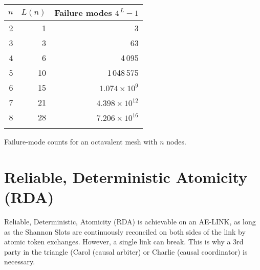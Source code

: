 \documentclass[../HFT-main.tex]{subfiles}
\begin{document}
\begin{margintable}
\centering
\begin{tabular}{@{}rrr@{}}
\toprule
\(n\) & \(L(n)\) & Failure modes \(4^{\,L}-1\)\\
\midrule
 2 &  1 & 3\\
 3 &  3 & 63\\
 4 &  6 & 4\,095\\
 5 & 10 & 1\,048\,575\\
 6 & 15 & \(1.074\times10^{9}\)\\
 7 & 21 & \(4.398\times10^{12}\)\\
 8 & 28 & \(7.206\times10^{16}\)\\
\bottomrule
\vspace{8pt}
\end{tabular}
\caption{Failure‑mode counts for an octavalent mesh with \(n\) nodes.}
\vspace{12pt}
\end{margintable}

\section{Reliable, Deterministic Atomicity (RDA)}%


Reliable, Deterministic, Atomicity (RDA)  is achievable on an AE-LINK, as long as the Shannon Slots are continuously reconciled on both sides of the link by atomic token exchanges. However, a single link can break. This is why a 3rd party in the triangle (Carol  (causal arbiter) or Charlie (causal coordinator) is necessary.
\end{document}
